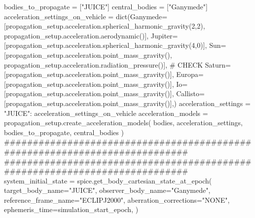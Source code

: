 {}
\markdownRendererSectionEnd \markdownRendererSectionBegin
{}\markdownRendererInterblockSeparator
{}bodies_to_propagate = ["JUICE"] central_bodies = ["Ganymede"]\markdownRendererInterblockSeparator
{}
\markdownRendererSectionEnd \markdownRendererSectionBegin
{}\markdownRendererInterblockSeparator
{}acceleration_settings_on_vehicle = dict(Ganymede=[propagation_setup.acceleration.spherical_harmonic_gravity(2,2), propagation_setup.acceleration.aerodynamic()], Jupiter=[propagation_setup.acceleration.spherical_harmonic_gravity(4,0)], Sun=[propagation_setup.acceleration.point_mass_gravity(), propagation_setup.acceleration.radiation_pressure()], # CHECK Saturn=[propagation_setup.acceleration.point_mass_gravity()], Europa=[propagation_setup.acceleration.point_mass_gravity()], Io=[propagation_setup.acceleration.point_mass_gravity()], Callisto=[propagation_setup.acceleration.point_mass_gravity()],)\markdownRendererInterblockSeparator
{}
\markdownRendererSectionEnd \markdownRendererSectionBegin
{}\markdownRendererInterblockSeparator
{}acceleration_settings = {"JUICE": acceleration_settings_on_vehicle}\markdownRendererInterblockSeparator
{}
\markdownRendererSectionEnd \markdownRendererSectionBegin
{}\markdownRendererInterblockSeparator
{}acceleration_models = propagation_setup.create_acceleration_models( bodies, acceleration_settings, bodies_to_propagate, central_bodies )\markdownRendererInterblockSeparator
{}###########################################################################\markdownRendererInterblockSeparator
{}
\markdownRendererSectionEnd \markdownRendererSectionBegin
{}\markdownRendererInterblockSeparator
{}###########################################################################\markdownRendererInterblockSeparator
{}
\markdownRendererSectionEnd \markdownRendererSectionBegin
{}\markdownRendererInterblockSeparator
{}system_initial_state = spice.get_body_cartesian_state_at_epoch( target_body_name="JUICE", observer_body_name="Ganymede", reference_frame_name="ECLIPJ2000", aberration_corrections="NONE", ephemeris_time=simulation_start_epoch, )\markdownRendererInterblockSeparator
{}
\markdownRendererSectionEnd \markdownRendererSectionBegin
{}\markdownRendererInterblockSeparator
